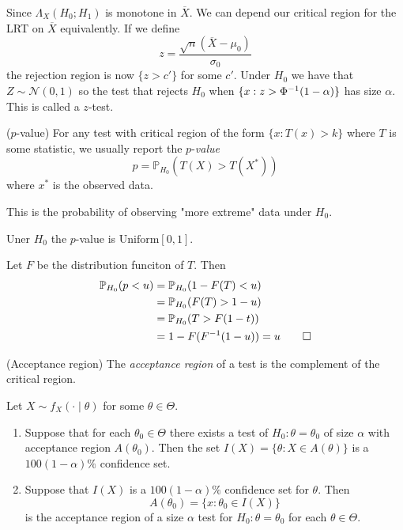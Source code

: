 \documentclass{article}
\begin{document}
Since $ \Lambda_X(H_0;H_1) $ is monotone in $ \overline X $. We can depend our critical region for the LRT on $ \overline X $ equivalently. If we define
\[
	z = \frac{\sqrt n (\overline X - \mu_0)}{\sigma_0}
\]
the rejection region is now $ \{ z>c'\} $ for some $ c' $. Under $ H_0 $ we have that $ Z\sim \mathcal N(0,1) $ so the test that rejects $ H_0 $ when $ \{x:z>{\Phi}^{-1}(1-\alpha)\} $ has size $ \alpha $. This is called a $ z $-test.
\par
\begin{definition}
	($ p $-value) For any test with critical region of the form $ \{x: T(x) > k\} $ where $ T $ is some statistic, we usually report the $ p $-\textit{value} 
	\[
	p = \mathbb P_{H_0}(T(X)>T(X^*))
	\]
	where $ x^* $ is the observed data.
\end{definition}
This is the probability  of observing "more extreme" data under $ H_0 $.
\begin{proposition}
	Uner $ H_0 $ the $ p $-value is $ \mathrm{Uniform}[0,1]$.
\end{proposition}
\pf Let $ F $ be the distribution funciton of $ T $. Then
\begin{align*}
	\mathbb P_{H_0}(p<u) &= \mathbb P_{H_0}(1-F(T)<u)\\
			     &= \mathbb P_{H_0}(F(T) > 1 - u)\\
			     &= \mathbb P_{H_0}(T> F(1-t))\\
			     &=1 - F({F}^{-1}(1 - u)) = u\qed
\end{align*}
\begin{definition}
	(Acceptance region) The \textit{acceptance region} of a test is the complement of the critical region.
\end{definition}
Let $ X\sim f_X(\cdot \mid \theta) $ for some $ \theta\in \Theta $.
\begin{theorem}
	\begin{enumerate}
		\item Suppose that for each $ \theta_0\in \Theta $ there exists a test of $ H_0:\theta = \theta_0 $ of size $ \alpha $ with acceptance region $ A(\theta_0) $. Then the set $ I(X) = \{ \theta: X\in A(\theta)\} $ is a $ 100(1-\alpha)\% $ confidence set.
		\item Suppose that $ I(X) $ is a $ 100(1-\alpha)\% $ confidence set for $ \theta $. Then 
			\[
				A(\theta_0) = \{x:\theta_0\in I(X)\}
			\]
			is the acceptance region of a size $ \alpha $ test for
			$ H_0:\theta = \theta_0 $ for each $ \theta \in \Theta $.
	\end{enumerate}
\end{theorem}
\end{document}
